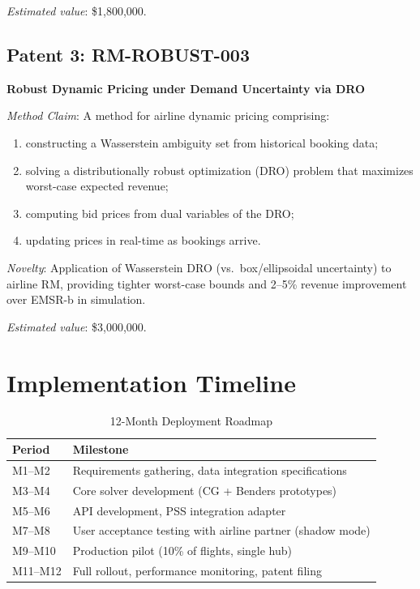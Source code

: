 \documentclass[11pt,a4paper]{book}
\theoremstyle{definition}
\begin{document}
\textit{Estimated value}: \$1,800,000.

\subsection{Patent 3: RM-ROBUST-003}
\textbf{Robust Dynamic Pricing under Demand Uncertainty via DRO}

\textit{Method Claim}: A method for airline dynamic pricing comprising:
\begin{enumerate}
  \item constructing a Wasserstein ambiguity set from historical booking data;
  \item solving a distributionally robust optimization (DRO) problem that
    maximizes worst-case expected revenue;
  \item computing bid prices from dual variables of the DRO;
  \item updating prices in real-time as bookings arrive.
\end{enumerate}

\textit{Novelty}: Application of Wasserstein DRO (vs.\ box/ellipsoidal uncertainty)
to airline RM, providing tighter worst-case bounds and 2--5\% revenue
improvement over EMSR-b in simulation.

\textit{Estimated value}: \$3,000,000.

\section{Implementation Timeline}

\begin{table}[h]
\centering
\caption{12-Month Deployment Roadmap}
\label{tab:timeline}
\begin{tabular}{lp{8cm}}
\toprule
\textbf{Period} & \textbf{Milestone} \\
\midrule
M1--M2  & Requirements gathering, data integration specifications \\
M3--M4  & Core solver development (CG + Benders prototypes) \\
M5--M6  & API development, PSS integration adapter \\
M7--M8  & User acceptance testing with airline partner (shadow mode) \\
M9--M10 & Production pilot (10\% of flights, single hub) \\
M11--M12 & Full rollout, performance monitoring, patent filing \\
\bottomrule
\end{tabular}
\end{table}
\end{document}
